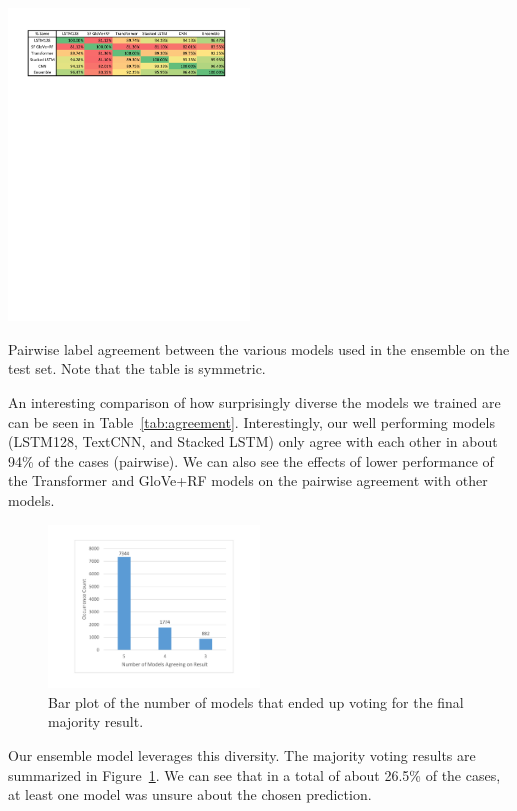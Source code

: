 \documentclass[10pt,conference,compsocconf]{IEEEtran}
\begin{document}
\begin{table}\centering
\includegraphics[width=0.48\textwidth]{./ensemble_tablev2}
\caption{Pairwise label agreement between the various models used in the ensemble on the test set. Note that the table is symmetric.}\label{tab:agreement}
\end{table}



An interesting comparison of how surprisingly diverse the models we trained are 
can be seen in Table~\ref{tab:agreement}. Interestingly, our well  performing models (LSTM128, TextCNN, and Stacked LSTM) only agree with each other in about 94\% of the cases (pairwise).
We can also see the effects of lower performance of the Transformer and GloVe+RF models on the pairwise agreement with other models. 

\begin{figure}\centering
\includegraphics[width=0.5\textwidth]{./ensemble_diag}
\caption{Bar plot of the number of models that ended up voting for the final majority result.}\label{fig:diag}
\end{figure}

Our ensemble model leverages this diversity. The majority voting results are summarized in Figure~\ref{fig:diag}. We can see that in a total of about 26.5\% of the cases, at least one model was unsure about the chosen prediction.
\end{document}
